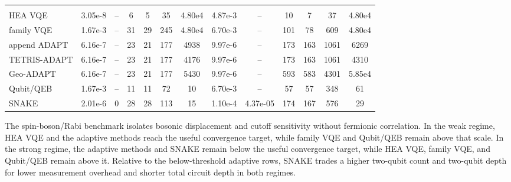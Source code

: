 \documentclass[
  reprint,
  amsmath,
  amssymb,
  aps,
  pra,
  nofootinbib,
  superscriptaddress,
  floatfix
]{revtex4-2}
\newcommand{\metrichead}[1]{\makebox[0.061\textwidth][c]{#1}}
\begin{document}
\begin{widetext}
\begin{minipage}{\textwidth}
\begin{center}
\begin{ruledtabular}
\begin{tabular}{p{}cccccc|cccccc}
 & \metrichead{$|\Delta E|$} & \metrichead{$1-F$} & \metrichead{$N_{2q}$} & \metrichead{$D_{2q}$} & \metrichead{$D_c$} & \metrichead{$S$} & \metrichead{$|\Delta E|$} & \metrichead{$1-F$} & \metrichead{$N_{2q}$} & \metrichead{$D_{2q}$} & \metrichead{$D_c$} & \metrichead{$S$}\\
\colrule
HEA VQE & 3.05e-8 & -- & 6 & 5 & 35 & 4.80e4 & 4.87e-3 & -- & 10 & 7 & 37 & 4.80e4\\
family VQE & 1.67e-3 & -- & 31 & 29 & 245 & 4.80e4 & 6.70e-3 & -- & 101 & 78 & 609 & 4.80e4\\
append ADAPT & 6.16e-7 & -- & 23 & 21 & 177 & 4938 & 9.97e-6 & -- & 173 & 163 & 1061 & 6269\\
TETRIS-ADAPT & 6.16e-7 & -- & 23 & 21 & 177 & 4176 & 9.97e-6 & -- & 173 & 163 & 1061 & 4310\\
Geo-ADAPT & 6.16e-7 & -- & 23 & 21 & 177 & 5430 & 9.97e-6 & -- & 593 & 583 & 4301 & 5.85e4\\
Qubit/QEB & 1.67e-3 & -- & 11 & 11 & 72 & 10 & 6.70e-3 & -- & 57 & 57 & 348 & 61\\
SNAKE & 2.01e-6 & 0 & 28 & 28 & 113 & 15 & 1.10e-4 & 4.37e-05 & 174 & 167 & 576 & 29\\
\end{tabular}
\end{ruledtabular}
\end{center}
\end{minipage}
\par\addvspace{1.0ex}
The spin-boson/Rabi benchmark isolates bosonic displacement and cutoff sensitivity without fermionic correlation. In the weak regime, HEA VQE and the adaptive methods reach the useful convergence target, while family VQE and Qubit/QEB remain above that scale. In the strong regime, the adaptive methods and SNAKE remain below the useful convergence target, while HEA VQE, family VQE, and Qubit/QEB remain above it. Relative to the below-threshold adaptive rows, SNAKE trades a higher two-qubit count and two-qubit depth for lower measurement overhead and shorter total circuit depth in both regimes.


\end{widetext}
\end{document}
